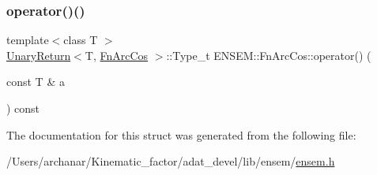 \mbox{\label{structENSEM_1_1FnArcCos_a7d507fc5962b17eedfa81873113d0b96}} 
\subsubsection{\texorpdfstring{operator()()}{operator()()}\hspace{0.1cm}{\footnotesize\ttfamily [2/2]}}
{\footnotesize\ttfamily template$<$class T $>$ \\
\mbox{\hyperlink{structENSEM_1_1UnaryReturn}{Unary\+Return}}$<$T, \mbox{\hyperlink{structENSEM_1_1FnArcCos}{Fn\+Arc\+Cos}} $>$\+::Type\+\_\+t E\+N\+S\+E\+M\+::\+Fn\+Arc\+Cos\+::operator() (\begin{DoxyParamCaption}\item[{const T \&}]{a }\end{DoxyParamCaption}) const\hspace{0.3cm}{\ttfamily [inline]}}



The documentation for this struct was generated from the following file\+:\begin{DoxyCompactItemize}
\item 
/\+Users/archanar/\+Kinematic\+\_\+factor/adat\+\_\+devel/lib/ensem/\mbox{\hyperlink{lib_2ensem_2ensem_8h}{ensem.\+h}}\end{DoxyCompactItemize}
